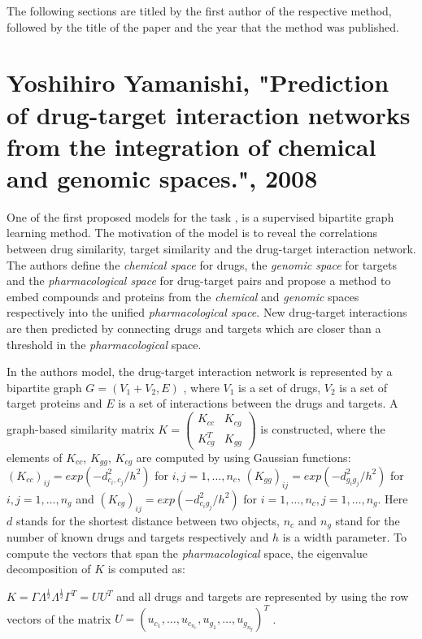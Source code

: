 The following sections are titled by the first author of the respective method, followed by the title of the paper and the year that the method was published.

\section{Yoshihiro Yamanishi, "Prediction of drug-target interaction networks from the integration of chemical and genomic spaces.", 2008}

One of the first proposed models for the task \cite{yamanishi2008prediction}, is a supervised bipartite graph learning method. The motivation of the model is to reveal the correlations between drug similarity, target similarity and the drug-target interaction network. The authors define the \textit{chemical space} for drugs, the \textit{genomic space} for targets and the \textit{pharmacological space} for drug-target pairs and propose a method to embed compounds and proteins from the \textit{chemical} and \textit{genomic} spaces respectively into the unified \textit{pharmacological space}. New drug-target interactions are then predicted by connecting drugs and targets which are closer than a threshold in the \textit{pharmacological} space. 

In the authors model, the drug-target interaction network is represented by a bipartite graph $G=(V_1+V_2, E)$ , where $V_1$ is a set of drugs, $V_2$ is a set of target proteins and $E$ is a set of interactions between the drugs and targets. A graph-based similarity matrix 
$ K = \begin{pmatrix}

K_{cc} & K_{cg} \\
K_{cg}^T & K_{gg}
\end{pmatrix}
$
is constructed, where the elements of $K_{cc}$, $K_{gg}$, $K_{cg}$ are computed by using Gaussian functions:
$(K_{cc})_{ij}=exp(-d^2_{c_i,c_j}/h^2)$ for $i,j=1,\dots,n_c$, $(K_{gg})_{ij}=exp(-d^2_{g_ig_j}/h^2)$ for $i,j=1,\dots,n_g$ and $(K_{cg})_{ij} = exp(-d^2_{c_ig_j}/h^2)$ for $i=1,\dots,n_c, j=1,\dots,n_g$. Here $d$ stands for the shortest distance between two objects,  $n_c$ and $n_g$ stand for the number of known drugs and targets respectively and $h$ is a width parameter. 
To compute the vectors that span the \textit{pharmacological} space, the eigenvalue decomposition of $K$ is computed as:

$K=\Gamma \Lambda^{\frac{1}{2}} \Lambda^{\frac{1}{2}} \Gamma ^T = UU^T$ and all drugs and targets are represented by using the row vectors of the matrix $U=(u_{c_1},\dots,u_{c_{n_c}},u_{g_1},\dots,u_{g_{n_g}})^T$ .

